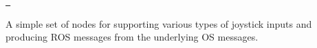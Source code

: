 \href{https://github.com/ros-drivers/joystick_drivers/actions}{\texttt{ }}

A simple set of nodes for supporting various types of joystick inputs and producing R\+OS messages from the underlying OS messages. 